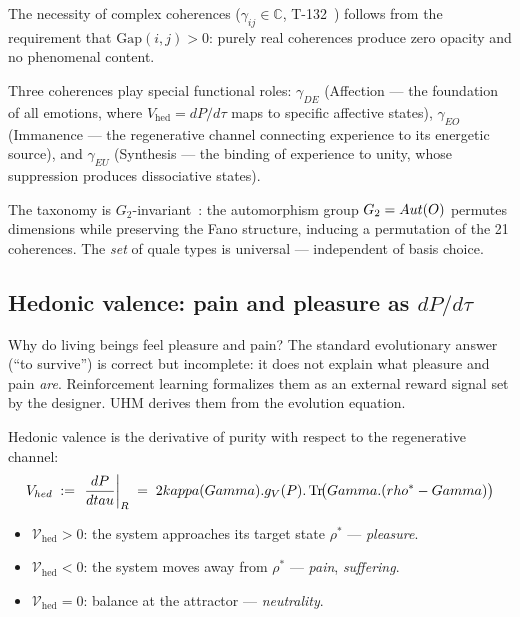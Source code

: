 The necessity of complex coherences ($\gamma_{ij} \in \mathbb{C}$, T-132~)
follows from the requirement that $\mathrm{Gap}(i,j) > 0$: purely real coherences
produce zero opacity and no phenomenal content.

Three coherences play special functional roles: $\gamma_{DE}$ (Affection --- the
foundation of all emotions, where $V_{\mathrm{hed}} = dP/d\tau$ maps to specific
affective states), $\gamma_{EO}$ (Immanence --- the regenerative channel connecting
experience to its energetic source), and $\gamma_{EU}$ (Synthesis --- the binding
of experience to unity, whose suppression produces dissociative states).

The taxonomy is $G_2$-invariant~: the automorphism group $G_2 = Aut(O)$
permutes dimensions while preserving the Fano structure, inducing a permutation of the
21 coherences. The \emph{set} of quale types is universal --- independent of basis choice.

\subsection{Hedonic valence: pain and pleasure as $dP/d\tau$}
\label{subsec:hedonic-valence}

Why do living beings feel pleasure and pain?  The standard evolutionary answer (``to survive'')
is correct but incomplete: it does not explain what pleasure and pain \emph{are}.
Reinforcement learning formalizes them as an external reward signal set by the designer.
UHM derives them from the evolution equation.

\begin{theorembox}
Hedonic valence is the derivative of purity with respect to the regenerative channel:
\begin{equation}
  V_{hed}
  \;:=\; \left.\frac{dP}{dtau}\right|_{R}
  \;=\; 2kappa(Gamma) . g_V(P) . \Tr\!\bigl(Gamma . (rho^* - Gamma)\bigr)
  \label{eq:hedonic-valence}
\end{equation}
\begin{itemize}[leftmargin=2em,nosep]
  \item $\mathcal{V}_{\mathrm{hed}} > 0$: the system approaches its target state $\rho^*$
        --- \emph{pleasure}.
  \item $\mathcal{V}_{\mathrm{hed}} < 0$: the system moves away from $\rho^*$
        --- \emph{pain}, \emph{suffering}.
  \item $\mathcal{V}_{\mathrm{hed}} = 0$: balance at the attractor --- \emph{neutrality}.
\end{itemize}
\end{theorembox}


